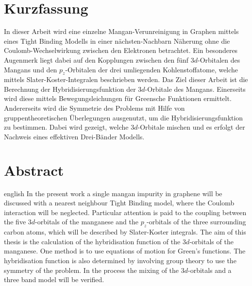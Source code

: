 \thispagestyle{plain}

\section*{Kurzfassung}
In dieser Arbeit wird eine einzelne Mangan-Verunreinigung in Graphen mittels eines Tight Binding Modells in einer nächsten-Nachbarn Näherung
ohne die Coulomb-Wechselwirkung zwischen den Elektronen betrachtet.
Ein besonderes Augenmerk liegt dabei auf den Kopplungen zwischen den fünf $3d$-Orbitalen des Mangans und den $p_z$-Orbitalen der drei umliegenden 
Kohlenstoffatome, welche mittels Slater-Koster-Integralen beschrieben werden.
Das Ziel dieser Arbeit ist die Berechnung der Hybridisierungsfunktion der $3d$-Orbitale des Mangans. 
Einerseits wird diese mittels Bewegungsleichungen für Greensche Funktionen ermittelt.
Andererseits wird die Symmetrie des Problems mit Hilfe von gruppentheoretischen Überlegungen ausgenutzt, um die Hybridisierungsfunktion zu bestimmen.
Dabei wird gezeigt, welche $3d$-Orbitale mischen und es erfolgt der Nachweis eines effektiven Drei-Bänder Modells.
\section*{Abstract}
\begin{foreignlanguage}{english}
In the present work a single mangan impurity in graphene will be discussed with a nearest neighbour Tight Binding model, where
the Coulomb interaction will be neglected.
Particular attention is paid to the coupling between the five $3d$-orbitals of the manganese and the $p_z$-orbitals of the three
surrounding carbon atoms, which will be described by Slater-Koster integrals.
The aim of this thesis is the calculation of the hybridisation function of the $3d$-orbitals of the manganese.
One method is to use equations of motion for Green's functions. 
The hybridisation function is also determined by involving group theory to use the symmetry of the problem.
In the process the mixing of the $3d$-orbitals and a three band model will be verified. 
\end{foreignlanguage}